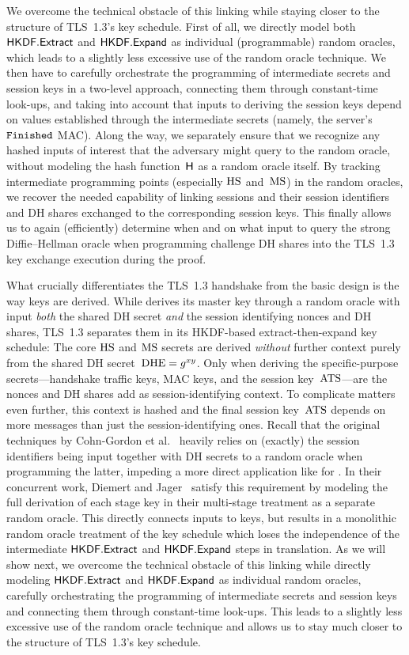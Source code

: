 We overcome the technical obstacle of this linking while staying closer to the structure of TLS~1.3's key schedule.
First of all, we directly model both $\mathsf{HKDF}.\mathsf{Extract}$ and $\mathsf{HKDF}.\mathsf{Expand}$ as individual (programmable) random oracles,
which leads to a slightly less excessive use of the random oracle technique.
We then have to carefully orchestrate the programming of intermediate secrets and session keys in a two-level approach,
connecting them through constant-time look-ups,
and taking into account that inputs to deriving the session keys depend on values established through the intermediate secrets (namely, the server's $\mathtt{Finished}$ MAC).
Along the way, we separately ensure that we recognize any hashed inputs of interest that the adversary might query to the random oracle, without modeling the hash function~$\mathsf{H}$ as a random oracle itself.
By tracking intermediate programming points (especially $\mathrm{HS}$ and~$\mathrm{MS}$) in the random oracles, we recover the needed capability of linking sessions and their session identifiers and DH shares exchanged to the corresponding session keys.
This finally allows us to again (efficiently) determine when and on what input to query the strong Diffie--Hellman oracle when programming challenge DH shares into the TLS~1.3 key exchange execution during the proof.

\else

What crucially differentiates the TLS~1.3 handshake from the basic \SIGMAI design is the way keys are derived.
While \SIGMAI derives its master key through a random oracle with input \emph{both} the shared DH secret \emph{and} the session identifying nonces and DH shares,
TLS~1.3 separates them in its HKDF-based extract-then-expand key schedule:
The core $\mathrm{HS}$ and $\mathrm{MS}$ secrets are derived \emph{without} further context purely from the shared DH secret~$\mathrm{DHE} = g^{xy}$.
Only when deriving the specific-purpose secrets---handshake traffic keys, MAC keys, and the session key~$\mathrm{ATS}$---are the nonces and DH shares add as session-identifying context.
To complicate matters even further, this context is hashed and the final session key~$\mathrm{ATS}$ depends on more messages than just the session-identifying ones.
Recall that the original techniques by Cohn-Gordon et al.~\cite{C:CCGJJ19} heavily relies on (exactly) the session identifiers being input together with DH secrets to a random oracle when programming the latter,
impeding a more direct application like for \SIGMAI.
In their concurrent work, Diemert and Jager~\cite{JC:DieJag20} satisfy this requirement by modeling the full derivation of each stage key in their multi-stage treatment as a separate random oracle.
This directly connects inputs to keys, but results in a monolithic random oracle treatment of the key schedule which loses the independence of the intermediate $\mathsf{HKDF}.\mathsf{Extract}$ and $\mathsf{HKDF}.\mathsf{Expand}$ steps in translation.
As we will show next, we overcome the technical obstacle of this linking while directly modeling $\mathsf{HKDF}.\mathsf{Extract}$ and $\mathsf{HKDF}.\mathsf{Expand}$ as individual random oracles,
carefully orchestrating the programming of intermediate secrets and session keys and connecting them through constant-time look-ups.
This leads to a slightly less excessive use of the random oracle technique and allows us to stay much closer to the structure of TLS~1.3's key schedule.

